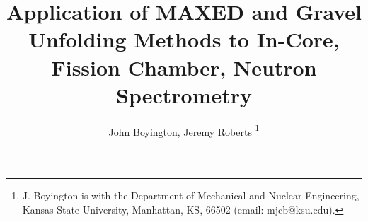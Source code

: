 \documentclass[journal]{IEEEtran}
\begin{document}
%
\title{Application of MAXED and Gravel Unfolding Methods to In-Core, Fission Chamber, Neutron Spectrometry}

\author{John Boyington, Jeremy Roberts%
\thanks{J. Boyington is with the Department
of Mechanical and Nuclear Engineering, Kansas State University, Manhattan,
KS, 66502 (email: mjcb@ksu.edu).}
}

% 
%



% 




\end{document}
